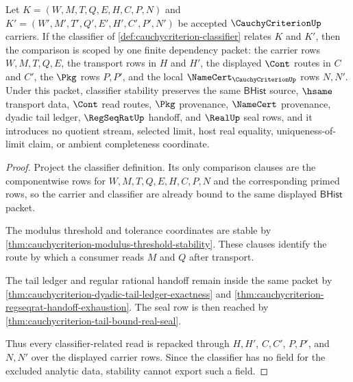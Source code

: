 \begin{theorem}
\label{thm:cauchycriterion-classifier-stability-scope}
Let $K=(W,M,T,Q,E,H,C,P,N)$ and $K'=(W',M',T',Q',E',H',C',P',N')$ be accepted $\CauchyCriterionUp$ carriers. If the classifier of \autoref{def:cauchycriterion-classifier} relates $K$ and $K'$, then the comparison is scoped by one finite dependency packet: the carrier rows $W,M,T,Q,E$, the transport rows in $H$ and $H'$, the displayed $\Cont$ routes in $C$ and $C'$, the $\Pkg$ rows $P,P'$, and the local $\NameCert_{\CauchyCriterionUp}$ rows $N,N'$. Under this packet, classifier stability preserves the same $\mathsf{BHist}$ source, $\hsame$ transport data, $\Cont$ read routes, $\Pkg$ provenance, $\NameCert$ provenance, dyadic tail ledger, $\RegSeqRatUp$ handoff, and $\RealUp$ seal rows, and it introduces no quotient stream, selected limit, host real equality, uniqueness-of-limit claim, or ambient completeness coordinate.
\end{theorem}
\begin{proof}
Project the classifier definition. Its only comparison clauses are the componentwise rows for $W,M,T,Q,E,H,C,P,N$ and the corresponding primed rows, so the carrier and classifier are already bound to the same displayed $\mathsf{BHist}$ packet.

The modulus threshold and tolerance coordinates are stable by \autoref{thm:cauchycriterion-modulus-threshold-stability}. These clauses identify the route by which a consumer reads $M$ and $Q$ after transport.

The tail ledger and regular rational handoff remain inside the same packet by \autoref{thm:cauchycriterion-dyadic-tail-ledger-exactness} and \autoref{thm:cauchycriterion-regseqrat-handoff-exhaustion}. The seal row is then reached by \autoref{thm:cauchycriterion-tail-bound-real-seal}.

Thus every classifier-related read is repacked through $H,H'$, $C,C'$, $P,P'$, and $N,N'$ over the displayed carrier rows. Since the classifier has no field for the excluded analytic data, stability cannot export such a field.
\end{proof}

